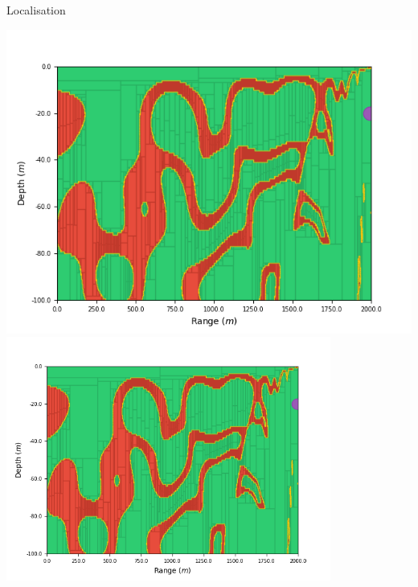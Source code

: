 \documentclass[9pt, xcolor={usenames, dvipsnames}]{beamer}
\begin{document}
				\begin{frame}{Localisation}
					\centering
					
					\begin{minipage}[t][0.1\textheight][t]{\textwidth}
						\begin{minipage}[t][\textheight][t]{0.325\textwidth}
							\begin{overprint}
								\centering\includegraphics[width=\textwidth]{images/localisation/Hydrophone_20_2000.png}
								\onslide<2-3>\centering\includegraphics[width=0.8\textwidth]{images/localisation/Hydrophone_20_2000.png}
							\end{overprint}
						\end{minipage}
						\hfill
						\begin{minipage}[t][\textheight][t]{0.325\textwidth}
							\begin{overprint}

\end{overprint}
\end{minipage}
\end{minipage}
\end{frame}
\end{document}

